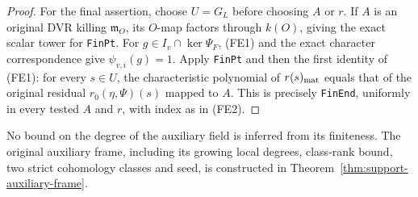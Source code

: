 \begin{proof}
For the final assertion, choose $U=G_L$ before choosing $A$ or $r$.
If $A$ is an original DVR killing $\mathfrak m_O$, its $O$-map
factors through $k(O)$, giving the exact scalar tower for
\texttt{FinPt}.  For $g\in I_v\cap\ker\Psi_F$, (FE1) and the
exact character correspondence give $\psi_{v,i}(g)=1$.
Apply \texttt{FinPt} and then the first identity of (FE1): for
every $s\in U$, the characteristic polynomial of $r(s)_{\rm mat}$
equals that of the original residual $r_0(\eta,\Psi)(s)$ mapped
to $A$.  This is precisely \texttt{FinEnd}, uniformly in every
tested $A$ and $r$, with index as in (FE2).
\end{proof}

No bound on the degree of the auxiliary field is inferred from
its finiteness.  The original auxiliary frame, including its growing
local degrees, class-rank bound, two strict cohomology classes and seed,
is constructed in Theorem~\ref{thm:support-auxiliary-frame}.
